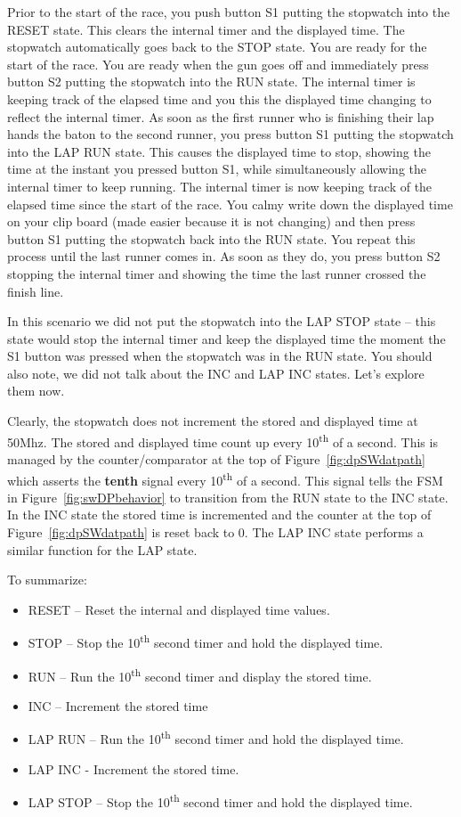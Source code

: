Prior to the start of the race, you push button S1 putting the stopwatch
into the RESET state. This clears the internal timer and the displayed
time. The stopwatch automatically goes back to the STOP state. You are
ready for the start of the race. You are ready when the gun goes off and
immediately press button S2 putting the stopwatch into the RUN state.
The internal timer is keeping track of the elapsed time and you this the
displayed time changing to reflect the internal timer. As soon as the
first runner who is finishing their lap hands the baton to the second
runner, you press button S1 putting the stopwatch into the LAP RUN
state. This causes the displayed time to stop, showing the time at the
instant you pressed button S1, while simultaneously allowing the
internal timer to keep running. The internal timer is now keeping track
of the elapsed time since the start of the race. You calmy write down
the displayed time on your clip board (made easier because it is not
changing) and then press button S1 putting the stopwatch back into the
RUN state. You repeat this process until the last runner comes in. As
soon as they do, you press button S2 stopping the internal timer and
showing the time the last runner crossed the finish line.

In this scenario we did not put the stopwatch into the LAP STOP state --
this state would stop the internal timer and keep the displayed time the
moment the S1 button was pressed when the stopwatch was in the RUN
state. You should also note, we did not talk about the INC and LAP INC
states. Let's explore them now.

Clearly, the stopwatch does not increment the stored and displayed time
at 50Mhz. The stored and displayed time count up every
10\textsuperscript{th} of a second. This is managed by the
counter/comparator at the top of Figure~\ref{fig:dpSWdatpath} which asserts the
\textbf{tenth} signal every 10\textsuperscript{th} of a second. This
signal tells the FSM in Figure~\ref{fig:swDPbehavior} to transition from the RUN state to the
INC state. In the INC state the stored time is incremented and the
counter at the top of Figure~\ref{fig:dpSWdatpath} is reset back to 0. The LAP INC state
performs a similar function for the LAP state.

To summarize:

\begin{itemize}
\item
  RESET -- Reset the internal and displayed time values.
\item
  STOP -- Stop the 10\textsuperscript{th} second timer and hold the
  displayed time.
\item
  RUN -- Run the 10\textsuperscript{th} second timer and display the
  stored time.
\item
  INC -- Increment the stored time
\item
  LAP RUN -- Run the 10\textsuperscript{th} second timer and hold the
  displayed time.
\item
  LAP INC - Increment the stored time.
\item
  LAP STOP -- Stop the 10\textsuperscript{th} second timer and hold the
  displayed time.
\end{itemize}

